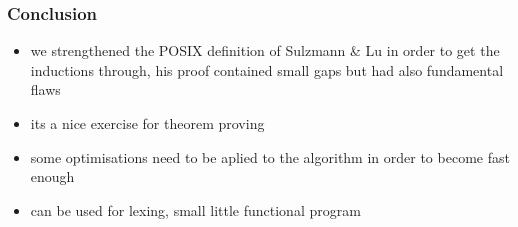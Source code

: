 \documentclass[dvipsnames,14pt,t]{beamer}
\begin{document}


\begin{frame}[c]
\frametitle{Conclusion}

\begin{itemize}
\item we strengthened the POSIX definition of Sulzmann \& Lu
  in order to get the inductions through, his proof
  contained small gaps but had also fundamental flaws\bigskip

\item its a nice exercise for theorem proving
\item some optimisations need to be aplied to the
 algorithm in order to become fast enough
\item can be used for lexing, small little functional 
 program
\end{itemize}

\end{frame}


\end{document}
